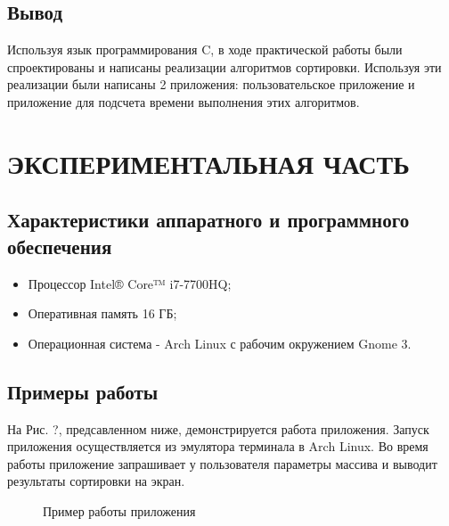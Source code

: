 \documentclass[a4paper,12pt]{article}
\begin{document}
\begin{flushleft}
\newpage
\subsection{Вывод}
Используя язык программирования C, в ходе практической работы были спроектированы и написаны реализации алгоритмов сортировки. Используя эти реализации были написаны 2 приложения: пользовательское приложение и приложение для подсчета времени выполнения этих алгоритмов.

\newpage
\section{ЭКСПЕРИМЕНТАЛЬНАЯ ЧАСТЬ}
\subsection{Характеристики аппаратного и программного обеспечения}
\begin{itemize}
\item Процессор Intel® Core™ i7-7700HQ;
\item Оперативная память 16 ГБ;
\item Операционная система - Arch Linux с рабочим окружением Gnome 3.
\end{itemize}

\newpage
\subsection{Примеры работы}
\begin{flushleft}
На Рис. ?, предсавленном ниже, демонстрируется работа приложения. Запуск приложения осуществляется из эмулятора терминала в Arch Linux. Во время работы приложение запрашивает у пользователя параметры массива и выводит результаты сортировки на экран.
\end{flushleft}
\begin{figure}[h]
\caption{Пример работы приложения}
\label{images:example}
\end{figure}


\end{flushleft}
\end{document}
